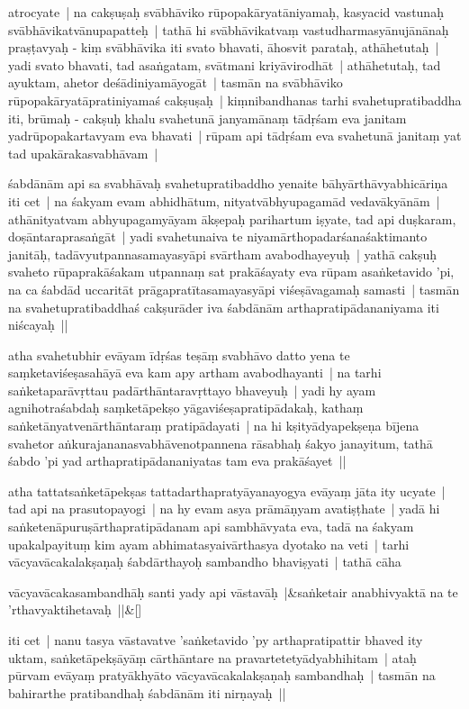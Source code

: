 \documentclass[article,12pt,a4paper]{memoir}
\begin{document}
	  \pstart atrocyate | na cakṣuṣaḥ svābhāviko rūpopakāryatāniyamaḥ, kasyacid vastunaḥ svābhāvikatvānupapatteḥ | tathā hi svābhāvikatvaṃ vastudharmasyānujānānaḥ praṣṭavyaḥ - kiṃ svābhāvika iti svato bhavati, āhosvit parataḥ, athāhetutaḥ | yadi svato bhavati, tad asaṅgatam, svātmani kriyāvirodhāt | athāhetutaḥ, tad ayuktam, ahetor deśādiniyamāyogāt | tasmān na svābhāviko rūpopakāryatāpratiniyamaś cakṣuṣaḥ | kiṃnibandhanas tarhi svahetupratibaddha iti, brūmaḥ - cakṣuḥ khalu svahetunā janyamānaṃ tādṛśam eva janitam yadrūpopakartavyam eva bhavati | rūpam api tādṛśam eva svahetunā janitaṃ yat tad upakārakasvabhāvam |
	\pend
      

	  \pstart śabdānām api sa svabhāvaḥ svahetupratibaddho yenaite bāhyārthāvyabhicāriṇa iti cet | na śakyam evam abhidhātum, nityatvābhyupagamād vedavākyānām | athānityatvam abhyupagamyāyam ākṣepaḥ parihartum iṣyate, tad api duṣkaram, doṣāntaraprasaṅgāt | yadi svahetunaiva te niyamārthopadarśanaśaktimanto janitāḥ, tadāvyutpannasamayasyāpi svārtham avabodhayeyuḥ | yathā cakṣuḥ svaheto rūpaprakāśakam utpannaṃ sat prakāśayaty eva rūpam asaṅketavido 'pi, na ca śabdād uccaritāt prāgapratītasamayasyāpi viśeṣāvagamaḥ samasti | tasmān na svahetupratibaddhaś cakṣurāder iva śabdānām arthapratipādananiyama iti niścayaḥ || 
	\pend
      

	  \pstart atha svahetubhir evāyam īdṛśas teṣāṃ svabhāvo datto yena te saṃketaviśeṣasahāyā eva kam apy artham avabodhayanti | na tarhi saṅketaparāvṛttau padārthāntaravṛttayo bhaveyuḥ | yadi hy ayam agnihotraśabdaḥ saṃketāpekṣo yāgaviśeṣapratipādakaḥ, kathaṃ saṅketānyatvenārthāntaraṃ pratipādayati | na hi kṣityādyapekṣeṇa bījena svahetor aṅkurajananasvabhāvenotpannena rāsabhaḥ śakyo janayitum, tathā śabdo 'pi yad arthapratipādananiyatas tam eva prakāśayet || 
	\pend
      

	  \pstart atha tattatsaṅketāpekṣas tattadarthapratyāyanayogya evāyaṃ jāta ity ucyate | tad api na prasutopayogi | na hy evam asya prāmāṇyam avatiṣṭhate | yadā hi saṅketenāpuruṣārthapratipādanam api sambhāvyata eva, tadā na śakyam upakalpayituṃ kim ayam abhimatasyaivārthasya dyotako na veti | tarhi vācyavācakalakṣaṇaḥ śabdārthayoḥ sambandho bhaviṣyati | tathā cāha
	\pend
      
	    
	    \stanza[\smallbreak]
	vācyavācakasambandhāḥ santi yady api vāstavāḥ |&saṅketair anabhivyaktā na te 'rthavyaktihetavaḥ ||\&[\smallbreak]


	

	  \pstart iti cet | nanu tasya vāstavatve 'saṅketavido 'py arthapratipattir bhaved ity uktam, saṅketāpekṣāyāṃ cārthāntare na pravartetetyādyabhihitam | ataḥ pūrvam evāyaṃ pratyākhyāto vācyavācakalakṣaṇaḥ sambandhaḥ | tasmān na bahirarthe pratibandhaḥ śabdānām iti nirṇayaḥ ||
	\pend
      
\end{document}
